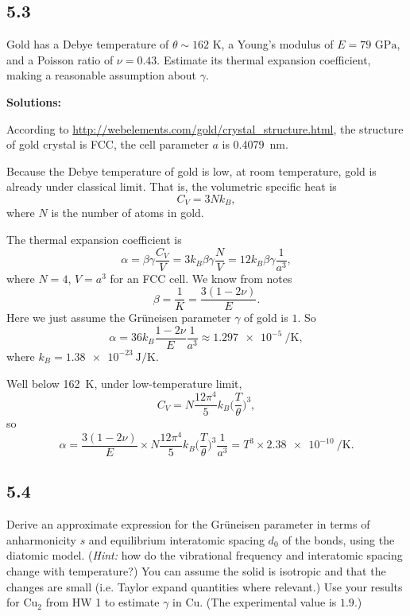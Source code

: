 \documentclass[12pt]{article}
\begin{document}
\subsection{5.3}
Gold has a Debye temperature of $\theta\sim\textrm{162 K}$, a Young's modulus of $E=\textrm{79 GPa}$, and a Poisson ratio of $\nu=0.43$.
Estimate its thermal expansion coefficient, making a reasonable assumption about $\gamma$.

\textbf{Solutions:}

According to \url{http://webelements.com/gold/crystal_structure.html}, the structure of gold crystal is FCC,
the cell parameter $a$ is \SI{0.4079}{\nano\meter}.

Because the Debye temperature of gold is low, at room temperature, gold is already under classical
limit. That is, the volumetric specific heat is
\begin{equation}
	C_V = 3 N k_B,
\end{equation}
where $N$ is the number of atoms in gold.

The thermal expansion coefficient is
\begin{equation}
	\alpha = \beta\gamma\frac{ C_V }{ V } = 3 k_B \beta\gamma\frac{ N }{ V } = 12 k_B \beta\gamma \frac{ 1 }{ a^3 },
\end{equation}
where $N = 4$, $V = a^3$ for an FCC cell.
We know from notes
\begin{equation}
	\beta = \frac{ 1 }{ K } = \frac{ 3 (1 - 2\nu) }{ E }.
\end{equation}
Here we just assume the Grüneisen parameter $\gamma$ of gold is $1$.
So
\begin{equation}
	\alpha = 36 k_B \frac{1 - 2\nu}{ E } \frac{ 1 }{ a^3 } \approx \SI{1.297e-5}{\per\kelvin},
\end{equation}
where $k_B = \SI{1.38e-23}{\joule\per\kelvin}$.

Well below \SI{162}{\kelvin}, under low-temperature limit,
\begin{equation}
	C_V =  N \frac{ 12 \pi^4 }{ 5 } k_B \bigg( \frac{ T }{ \theta } \bigg)^3,
\end{equation}
so
\begin{equation}
	\alpha = \frac{ 3 (1 - 2\nu) }{ E } \times N \frac{ 12 \pi^4 }{ 5 } k_B \bigg( \frac{ T }{ \theta } \bigg)^3 \frac{ 1 }{ a^3 }
	= T^3 \times \SI{2.38e-10}{\per\kelvin}.
\end{equation}

\subsection{5.4}
Derive an approximate expression for the Grüneisen parameter in terms of
anharmonicity $s$ and equilibrium interatomic spacing $d_0$ of the bonds, using the diatomic model.
({\it Hint:} how do the vibrational frequency and interatomic spacing change with temperature?)
You can assume the solid is isotropic and that the changes are small
(i.e. Taylor expand quantities where relevant.)  Use your results for Cu$_2$ from HW 1 to estimate
$\gamma$ in Cu. (The experimental value is $1.9$.)
\end{document}

